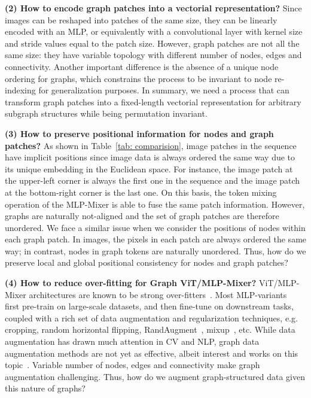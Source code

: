 \documentclass{article}
\begin{document}
\textbf{(2) How to encode graph patches into a vectorial representation?} 
 Since images can be reshaped into patches of the same  size, they can be linearly encoded with an MLP, or equivalently with a convolutional layer with kernel size and stride values equal to the patch size. However, graph patches are not all the same size: they have variable topology with different number of nodes, edges and connectivity. Another important difference is the absence of a unique node ordering for graphs, which constrains the process to be invariant to node re-indexing for generalization purposes. In summary, we need a process that can transform graph patches into a fixed-length vectorial representation for arbitrary subgraph structures while being permutation invariant.  


\textbf{(3) How to preserve positional information for nodes and graph patches?}  
As shown in Table~\ref{tab: comparision}, image patches in the sequence have implicit positions since image data is always ordered the same way due to its unique embedding in the Euclidean space. For instance, the image patch at the upper-left corner is always the first one in the sequence and the image patch at the bottom-right corner is the last one. On this basis, the token mixing operation of the MLP-Mixer is able to fuse the same patch information. However, graphs are naturally not-aligned and the set of graph patches are therefore unordered. We face a similar issue when we consider the positions of nodes within each graph patch. In images, the pixels in each patch are always ordered the same way; in contrast, nodes in graph tokens are naturally unordered. Thus, how do we preserve local and global positional consistency for nodes and graph patches?
 

\textbf{(4) How to reduce over-fitting for Graph ViT/MLP-Mixer?} 
ViT/MLP-Mixer architectures are known to be strong over-fitters~\citep{liu2021gmlp}. Most MLP-variants~\citep{tolstikhin2021mlp, touvron2021resmlp, wang2022dynamixer} first pre-train on large-scale datasets, and then fine-tune on downstream tasks, coupled with a rich set of data augmentation and regularization techniques, e.g. cropping, random horizontal flipping, RandAugment~\citep{cubuk2020randaugment}, mixup~\citep{zhang2017mixup}, etc. While data augmentation has drawn much attention in CV and NLP, graph data augmentation methods are not yet as effective, albeit interest and works on this topic~\citep{zhao2021data}. Variable number of nodes, edges and connectivity make graph augmentation challenging. Thus, how do we augment graph-structured data given this nature of graphs? 
\end{document}
